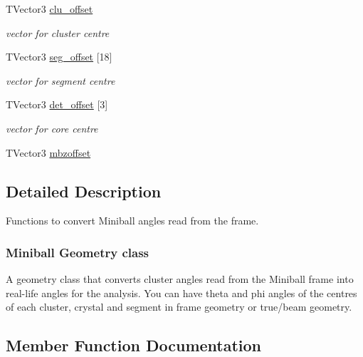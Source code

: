 \begin{DoxyCompactItemize}
\mbox{\label{class_m_b_geometry_a844568e73d8f596287486f67b1dea736}} 
T\+Vector3 \hyperlink{class_m_b_geometry_a844568e73d8f596287486f67b1dea736}{clu\+\_\+offset}
\begin{DoxyCompactList}\small\item\em vector for cluster centre \end{DoxyCompactList}\item 
\mbox{\label{class_m_b_geometry_a09539c16aa50b8a85866443ea0d8ffbd}} 
T\+Vector3 \hyperlink{class_m_b_geometry_a09539c16aa50b8a85866443ea0d8ffbd}{seg\+\_\+offset} \mbox{[}18\mbox{]}
\begin{DoxyCompactList}\small\item\em vector for segment centre \end{DoxyCompactList}\item 
\mbox{\label{class_m_b_geometry_a4cf9fa07ab092a5956de7aaa78b37470}} 
T\+Vector3 \hyperlink{class_m_b_geometry_a4cf9fa07ab092a5956de7aaa78b37470}{det\+\_\+offset} \mbox{[}3\mbox{]}
\begin{DoxyCompactList}\small\item\em vector for core centre \end{DoxyCompactList}\item 
T\+Vector3 \hyperlink{class_m_b_geometry_a687268aeee7a0e2edc0486a76a07affe}{mbzoffset}
\end{DoxyCompactItemize}


\subsection{Detailed Description}
Functions to convert Miniball angles read from the frame. 



 \subsubsection*{Miniball Geometry class }

A geometry class that converts cluster angles read from the Miniball frame into real-\/life angles for the analysis. You can have theta and phi angles of the centres of each cluster, crystal and segment in frame geometry or true/beam geometry. 

\subsection{Member Function Documentation}
\mbox{\label{class_m_b_geometry_a39f685610ae0e68e547a46f8ef992599}} 
